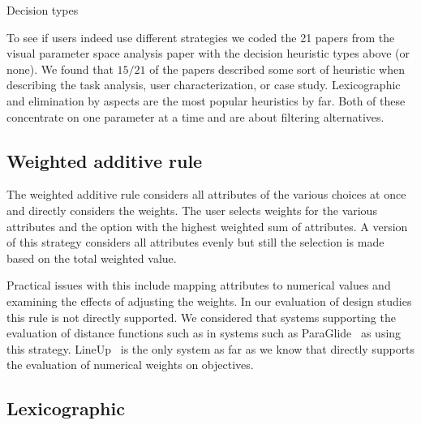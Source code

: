 \begin{table*}[tb]
  \begin{center}
    \caption{Decision types }
  \end{center}
\end{table*}

To see if users indeed use different strategies we coded the 21 papers from the
visual parameter space analysis paper \citep{Sedlmair:2014} with the decision
heuristic types above (or none). We found that $15/21$ of the papers described
some sort of heuristic when describing the task analysis, user
characterization, or case study.
Lexicographic and elimination by aspects are the most popular heuristics
by far. Both of these concentrate on one parameter at a time and are
about filtering alternatives. 


\subsection{Weighted additive rule}\label{weighted-additive-rule}

The weighted additive rule considers all
attributes of the various choices at once and directly considers 
the weights. The user selects weights for the various attributes and 
the option with the highest weighted sum of attributes.
A version of this strategy considers all attributes evenly but still
the selection is made based on the total weighted value.

Practical issues with this include mapping attributes to numerical values
and examining the effects of adjusting the weights. In our evaluation of
design studies this rule is not directly supported. We considered that
systems supporting the evaluation of distance functions such as 
in systems such as ParaGlide~\citep{Bergner:2013} as using this strategy.
LineUp~\citep{Gratzl:2013} is the only system as far as we know that
directly supports the evaluation of numerical weights on objectives. 

\subsection{Lexicographic}\label{lexicographic}

